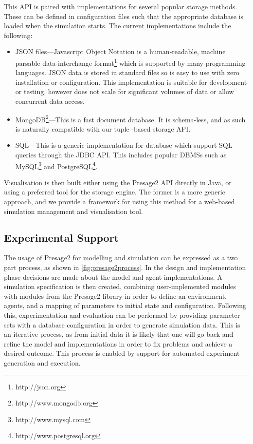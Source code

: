 This \ac{API} is paired with implementations for several popular storage
methods. These can be defined in configuration files such that the appropriate
database is loaded when the simulation starts. The current implementations
include the following:
\begin{itemize}
	\item JSON files---Javascript Object Notation is a human-readable, machine parsable
	data-interchange format\footnote{http://json.org} which is supported by many
	programming languages. JSON data is stored in standard files so is easy to use
	with zero installation or configuration. This implementation is suitable for
	development or testing, however does not scale for significant volumes of data
	or allow concurrent data access.
	\item MongoDB\footnote{http://www.mongodb.org}---This is a fast document
	database. It is schema-less, and as such is naturally compatible with our tuple
	-based storage \ac{API}.
	\item SQL---This is a generic implementation for database which support SQL
	queries through the \ac{JDBC} \ac{API}. This includes popular \acp{DBMS} such
	as MySQL\footnote{http://www.mysql.com} and PostgreSQL\footnote{http://www.postgresql.org}.
\end{itemize}

Visualisation is then built either using the Presage2 \ac{API} directly in Java,
or using a preferred tool for the storage engine. The former is a more generic
approach, and we provide a framework for using this method for a web-based
simulation management and visualisation tool. 

\subsection{Experimental Support}

The usage of Presage2 for modelling and simulation can be expressed as a two
part process, as shown in \autoref{fig:presage2process}. In the design and
implementation phase decisions are made about the model and agent
implementations. A simulation specification is then created, combining 
user-implemented modules with modules from the Presage2 library in order to define
an environment, agents, and a mapping of parameters to initial state and
configuration. Following this, experimentation and evaluation can be performed
by providing parameter sets with a database configuration in order to generate
simulation data. This is an iterative process, as from initial data it is
likely that one will go back and refine the model and implementations in order
to fix problems and achieve a desired outcome. This process is enabled by
support for automated experiment generation and execution.


